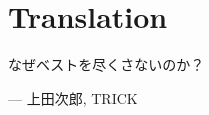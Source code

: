 
\cleardoublepage{}
\pagestyle{headings}
\setcounter{page}{1}

\chapter*{Translation}

\epigraph{なぜベストを尽くさないのか？}{--- \textup{上田次郎}, TRICK}

\tableofcontents



